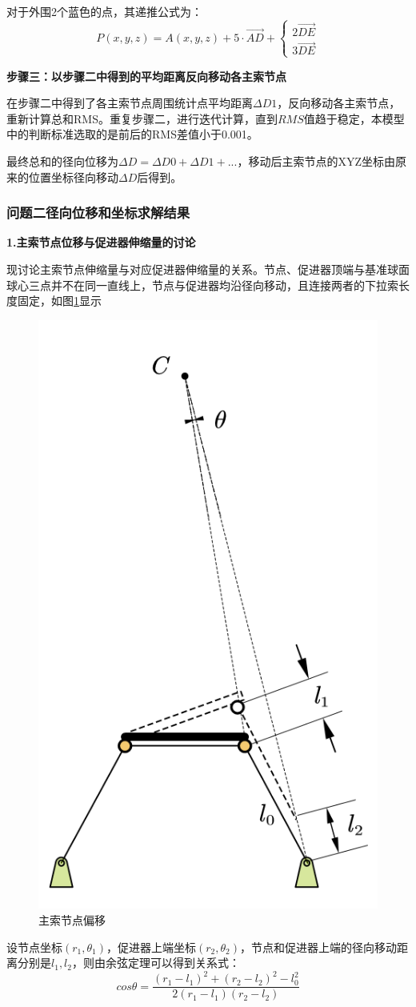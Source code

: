 \documentclass[withoutpreface,bwprint]{cumcmthesis} %
\begin{document}
	对于外围2个蓝色的点，其递推公式为：
	\begin{equation}
	P(x, y, z)=A(x, y, z)+5 \cdot \overrightarrow{A D}+\left\{\begin{array}{l}
	2 \overrightarrow{D E} \\
	3 \overrightarrow{D E}
	\end{array}\right.
	\end{equation}
		
		\textbf{步骤三：以步骤二中得到的平均距离反向移动各主索节点}
		
		在步骤二中得到了各主索节点周围统计点平均距离$\Delta D1$，反向移动各主索节点，重新计算总和RMS。重复步骤二，进行迭代计算，直到$RMS$值趋于稳定，本模型中的判断标准选取的是前后的RMS差值小于0.001。
		
		最终总和的径向位移为$\Delta D=\Delta D0+\Delta D1+...$，移动后主索节点的XYZ坐标由原来的位置坐标径向移动$\Delta D$后得到。
	
	\subsubsection{问题二径向位移和坐标求解结果}

	\textbf{1.主索节点位移与促进器伸缩量的讨论}
	
	现讨论主索节点伸缩量与对应促进器伸缩量的关系。节点、促进器顶端与基准球面球心三点并不在同一直线上，节点与促进器均沿径向移动，且连接两者的下拉索长度固定，如图\ref{主索节点偏移}显示
	\begin{figure}[H]
		\centering
		\includegraphics[height=0.6\textwidth]{主索节点偏移.png}
		\caption{主索节点偏移}\label{主索节点偏移}
	\end{figure}
	
	设节点坐标$(r_1,\theta_1)$，促进器上端坐标$(r_2,\theta_2)$，节点和促进器上端的径向移动距离分别是$l_1,l_2$，则由余弦定理可以得到关系式：
	\begin{equation}\label{节点偏移余弦}
	cos\theta = \frac{(r_1-l_1)^2+(r_2-l_2)^2-l_0^2}{2(r_1-l_1)(r_2-l_2)}
	\end{equation}
	
\end{document}
